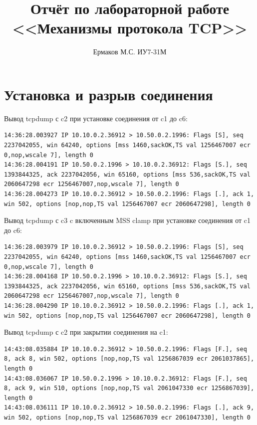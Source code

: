 \documentclass[a4paper,12pt]{article}
\title{Отчёт по лабораторной работе \\ <<Механизмы протокола TCP>>}
\author{Ермаков М.С. ИУ7-31М}
\begin{document}
\maketitle

\tableofcontents


\section{Установка и разрыв соединения}

Вывод tcpdump с c2 при установке соединения от c1 до c6:
\begin{Verbatim}
14:36:28.003927 IP 10.10.0.2.36912 > 10.50.0.2.1996: Flags [S], seq 2237042055, win 64240, options [mss 1460,sackOK,TS val 1256467007 ecr 0,nop,wscale 7], length 0
14:36:28.004191 IP 10.50.0.2.1996 > 10.10.0.2.36912: Flags [S.], seq 1393844325, ack 2237042056, win 65160, options [mss 536,sackOK,TS val 2060647298 ecr 1256467007,nop,wscale 7], length 0
14:36:28.004273 IP 10.10.0.2.36912 > 10.50.0.2.1996: Flags [.], ack 1, win 502, options [nop,nop,TS val 1256467007 ecr 2060647298], length 0
\end{Verbatim}

Вывод tcpdump с c3 c включенным MSS clamp при установке соединения от c1 до c6:
\begin{Verbatim}
14:36:28.003979 IP 10.10.0.2.36912 > 10.50.0.2.1996: Flags [S], seq 2237042055, win 64240, options [mss 1460,sackOK,TS val 1256467007 ecr 0,nop,wscale 7], length 0
14:36:28.004168 IP 10.50.0.2.1996 > 10.10.0.2.36912: Flags [S.], seq 1393844325, ack 2237042056, win 65160, options [mss 536,sackOK,TS val 2060647298 ecr 1256467007,nop,wscale 7], length 0
14:36:28.004290 IP 10.10.0.2.36912 > 10.50.0.2.1996: Flags [.], ack 1, win 502, options [nop,nop,TS val 1256467007 ecr 2060647298], length 0
\end{Verbatim}

Вывод tcpdump с c2 при закрытии соединения на c1:
\begin{Verbatim}
14:43:08.035884 IP 10.10.0.2.36912 > 10.50.0.2.1996: Flags [F.], seq 8, ack 8, win 502, options [nop,nop,TS val 1256867039 ecr 2061037865], length 0
14:43:08.036067 IP 10.50.0.2.1996 > 10.10.0.2.36912: Flags [F.], seq 8, ack 9, win 510, options [nop,nop,TS val 2061047330 ecr 1256867039], length 0
14:43:08.036111 IP 10.10.0.2.36912 > 10.50.0.2.1996: Flags [.], ack 9, win 502, options [nop,nop,TS val 1256867039 ecr 2061047330], length 0
\end{Verbatim}
\end{document}
